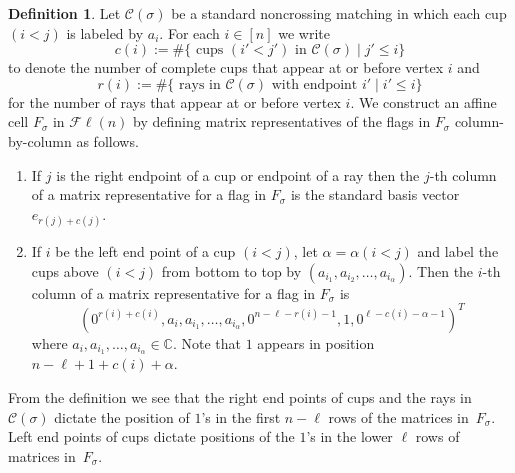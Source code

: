 \documentclass[11pt]{amsart}
\theoremstyle{remark}
\theoremstyle{remark}
\theoremstyle{definition}
\theoremstyle{definition}
\theoremstyle{definition}
\newtheorem{definition}[theorem]{Definition}
\numberwithin{equation}{section}
\newcommand{\C}{\mathbb{C}}           %
\newcommand{\ga}{\alpha}
\newcommand{\gs}{\sigma}
\newcommand{\cc}{\mathcal{C}}
\newcommand{\al}{\alpha}
\newcommand{\cupsigma}{\cc(\gs)}
\newcommand{\cell}{F_\gs}
\begin{document}
\begin{definition}\label{def:cell}
Let $\cupsigma$ be a standard noncrossing matching in which each cup $(i<j)$ is labeled by $a_i$. For each $i\in [n]$ we write
\[
c(i):= \#\{ \text{ cups }(i'<j')\text{ in $\cupsigma$} \mid j'\leq i\}
\]
to denote the number of complete cups that appear at or before vertex $i$ and 
\[
r(i) := \#\{ \text{ rays in $\cupsigma$ with endpoint $i'$} \mid i' \leq i \}
\]
for the number of rays that appear at or before vertex $i$.
We construct an affine cell $\cell$ in $\mathcal{F}\ell(n)$ by defining matrix representatives of the flags in $\cell$ column-by-column as follows.
\begin{enumerate}
\item  If $j$ is the right endpoint of a cup or endpoint of a ray then the $j$-th column of a matrix representative for a flag in $\cell$ is the standard basis vector $e_{r(j)+c(j)}$.

     
\item If $i$ be the left end point of a cup $(i<j)$, let $\al = \al(i<j)$ and label the cups above $(i<j)$ from bottom to top by $\left(a_{i_1}, a_{i_2}, \ldots, a_{i_{\ga}}\right)$. Then the $i$-th column of a matrix representative for a flag in $\cell$ is
\[
\left(0^{r(i)+c(i)},a_i,a_{i_1}, \ldots, a_{i_{\ga}}, 0^{n-\ell-r(i)-1}, 1,0^{\ell-c(i)-\ga-1}\right)^T
\]
where $a_{i}, a_{i_1},\ldots, a_{i_{\ga}}\in \C$. Note that $1$ appears in position $n-\ell+1 + c(i)+\ga$.
\end{enumerate}
\end{definition}

From the definition we see that the right end points of cups and the rays in $\cupsigma$ dictate the position of $1$'s in the first $n-\ell$ rows of the matrices in~$\cell$. Left end points of cups dictate positions of the $1$'s in the lower $\ell$ rows of matrices in~$\cell$.
\end{document}
